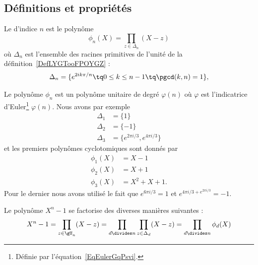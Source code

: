 \subsection{Définitions et propriétés}

\begin{definition}  \label{DefXGHooRAXlpp}
    Le  d'indice \( n\) est le polynôme
    \begin{equation}    \label{EqLjGYKK}
        \phi_n(X)=\prod_{z\in\Delta_n}(X-z)
    \end{equation}
    où \( \Delta_n\) est l'ensemble des racines primitives de l'unité de la définition~\ref{DefLYGTooFPOYGZ} :
    \begin{equation}
        \Delta_n=\{  e^{2ik\pi/n}\tq 0\leq k\leq n-1\tq \pgcd(k,n)=1 \},
    \end{equation}
\end{definition}

Le polynôme \( \phi_n\) est un polynôme unitaire de degré \( \varphi(n)\) où \( \varphi\) est l'indicatrice d'Euler\footnote{Définie par l'équation~\ref{EqEulerGqPsvi}.} \( \varphi(n)\). Nous avons par exemple
\begin{subequations}
    \begin{align}
        \Delta_1&=\{ 1 \}\\
        \Delta_2&=\{ -1 \}\\
        \Delta_3&=\{  e^{2\pi i/3}, e^{4\pi i/3} \}
    \end{align}
\end{subequations}
et les premiers polynômes cyclotomiques sont donnés par
\begin{subequations}
    \begin{align}
        \phi_1(X)&=X-1\\
        \phi_2(X)&=X+1\\
        \phi_3(X)&=X^2+X+1.
    \end{align}
\end{subequations}
Pour le dernier nous avons utilisé le fait que \(  e^{6\pi i/3}=1\) et \(  e^{4\pi i/3+ e^{2\pi i/3}}=-1\).

\begin{lemma}   \label{LemKYGBooAwpOHD}
    Le polynôme \( X^n-1\) se factorise des diverses manières suivantes :
    \begin{equation}
        X^n-1=\prod_{z\in \gU_n}(X-z)=\prod_{d\divides n}\prod_{z\in \Delta_d}(X-z)=\prod_{d\divides n}\phi_d(X)
    \end{equation}
\end{lemma}

